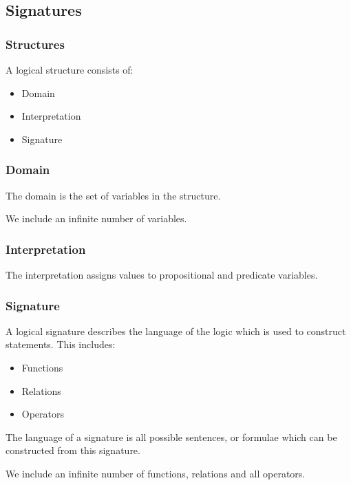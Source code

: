 
\subsection{Signatures}

\subsubsection{Structures}

A logical structure consists of:

\begin{itemize}
\item Domain
\item Interpretation
\item Signature
\end{itemize}

\subsubsection{Domain}

The domain is the set of variables in the structure.

We include an infinite number of variables.

\subsubsection{Interpretation}

The interpretation assigns values to propositional and predicate variables.

\subsubsection{Signature}

A logical signature describes the language of the logic which is used to construct statements. This includes:

\begin{itemize}
\item Functions
\item Relations
\item Operators
\end{itemize}

The language of a signature is all possible sentences, or formulae which can be constructed from this signature.

We include an infinite number of functions, relations and all operators.

